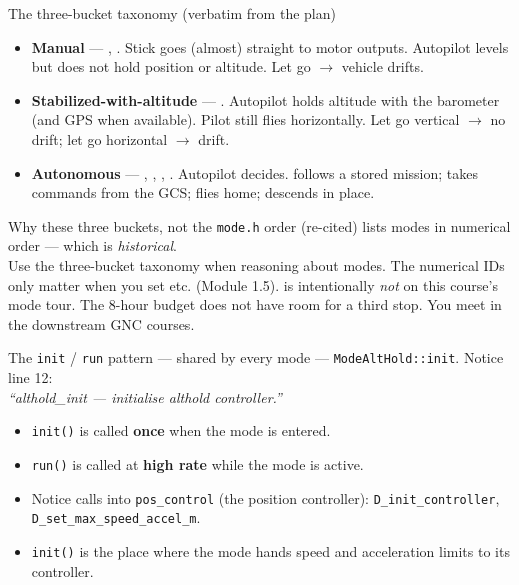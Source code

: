 \documentclass[aspectratio=169,11pt]{beamer}
\begin{document}
\begin{frame}{The three-bucket taxonomy (verbatim from the plan)}
  \begin{itemize}
    \item \textbf{Manual} --- , . Stick goes (almost) straight to motor outputs. Autopilot levels but does not hold position or altitude. Let go $\rightarrow$ vehicle drifts.
    \item \textbf{Stabilized-with-altitude} --- . Autopilot holds altitude with the barometer (and GPS when available). Pilot still flies horizontally. Let go vertical $\rightarrow$ no drift; let go horizontal $\rightarrow$ drift.
    \item \textbf{Autonomous} --- , , , . Autopilot decides.  follows a stored mission;  takes commands from the GCS;  flies home;  descends in place.
  \end{itemize}
\end{frame}

\begin{frame}{Why these three buckets, not the \texttt{mode.h} order}
   (re-cited) lists modes in numerical order --- which is \emph{historical}.\\[1ex]
  Use the three-bucket taxonomy when reasoning about modes. The numerical IDs only matter when you set  etc. (Module 1.5).
  \vfill
   is intentionally \emph{not} on this course's mode tour. The 8-hour budget does not have room for a third stop. You meet  in the downstream GNC courses.
\end{frame}

\begin{frame}{The \texttt{init} / \texttt{run} pattern --- shared by every mode}
   --- \texttt{ModeAltHold::init}. Notice line 12:\\
  \emph{``althold\_init --- initialise althold controller.''}
  \begin{itemize}
    \item \texttt{init()} is called \textbf{once} when the mode is entered.
    \item \texttt{run()} is called at \textbf{high rate} while the mode is active.
    \item Notice calls into \texttt{pos\_control} (the position controller): \texttt{D\_init\_controller}, \texttt{D\_set\_max\_speed\_accel\_m}.
    \item \texttt{init()} is the place where the mode hands speed and acceleration limits to its controller.
  \end{itemize}
\end{frame}
\end{document}

